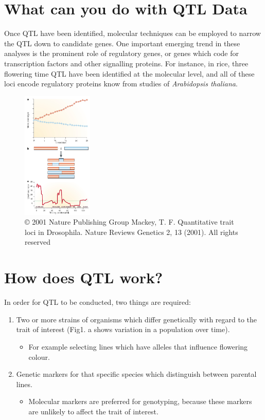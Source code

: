 \documentclass[a4paper]{article}
\begin{document}
\section{What can you do with QTL Data}
\label{sec-2}
Once QTL have been identified, molecular techniques can be employed to narrow the QTL down to candidate genes. One important
emerging trend in these analyses is the prominent role of regulatory genes, or genes which code for transcription factors and other 
signalling proteins. For instance, in rice, three flowering time QTL have been identified at the molecular level, and all of these loci 
encode regulatory proteins know from studies of \emph{Arabidopsis thaliana}.

\begin{center}
\begin{figure}[htb]
\centering
\includegraphics[width=0.3\textwidth,height=0.5\textwidth]{./images/qtl.jpg}
\caption{\label{fig:QTL-Data}© 2001 Nature Publishing Group Mackey, T. F. Quantitative trait loci in Drosophila. Nature Reviews Genetics 2, 13 (2001). All rights reserved}
\end{figure}
\end{center}

\section{How does QTL work?}
\label{sec-3}
In order for QTL to be conducted, two things are required: 
\begin{enumerate}
\item Two or more strains of organisms which differ genetically with regard to the trait of interest (Fig1. a shows variation in a population over time).
\begin{itemize}
\item For example selecting lines which have alleles that influence flowering colour.
\end{itemize}
\item Genetic markers for that specific species  which distinguish between parental lines.
\begin{itemize}
\item Molecular markers are preferred for genotyping, because these markers are unlikely to affect the trait of interest.
\end{itemize}
\end{enumerate}
\end{document}
